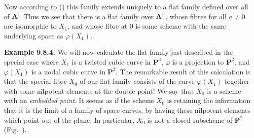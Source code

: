 {Now according to () this family extends uniquely to a flat family defined over all of $\AffSpace{1}$ Thus we see that there is a flat family over $\AffSpace{1}$, whose fibres for all $a\ne0$ are isomorphic to $X_1$, and whose fibre at $0$ is some scheme with the same underlying space as $\varphi(X_1)$.

\medskip
\noindent\hypertarget{result-III-9.8.4}{}\textbf{Example 9.8.4.} We will now calculate the flat family just described in the special case where $X_1$ is a twisted cubic curve in $\mathbf P^3$, $\varphi$ is a projection to $\mathbf P^2$, and $\varphi(X_1)$ is a nodal cubic curve in $\mathbf P^2$. The remarkable result of this calculation is that the special fibre $X_0$ of our flat family consists of the curve $\varphi(X_1)$ together with some nilpotent elements at the double point! We say that $X_0$ is a scheme with an \emph{embedded point}. It seems as if the scheme $X_0$ is retaining the information that it is the limit of a family of space curves, by having these nilpotent elements which point out of the plane. In particular, $X_0$ is not a closed subscheme of $\mathbf P^2$ (Fig.~).}
